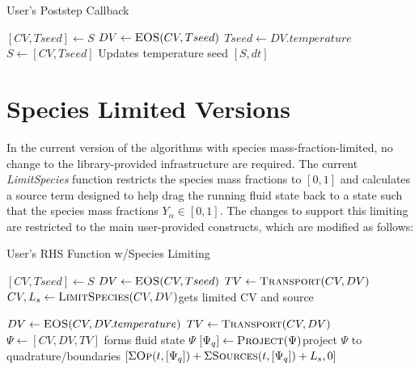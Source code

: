 \documentclass{article}
\begin{document}
\begin{algorithm}
  \caption{User's Poststep Callback}
  \begin{algorithmic}[1]
    \State $[CV, Tseed] \gets S$
    \State $DV \gets \Call{EOS}{CV, Tseed}$
    \State $Tseed \gets DV.temperature$
    \State $S \gets [CV, Tseed]$ \Comment Updates temperature seed
    \State \Return $[S, dt]$
    \EndProcedure  \end{algorithmic}
\end{algorithm}


\section{Species Limited Versions}
In the current version of the algorithms with species mass-fraction-limited, no change to the library-provided infrastructure are required.  The current \textit{LimitSpecies} function restricts the species mass fractions to $[0, 1]$ and calculates a source term designed to help drag the running fluid state back to a state such that the species mass fractions $Y_\alpha \in [0, 1]$.  The changes to support this limiting are restricted to the main user-provided constructs, which are modified as follows:


%
\begin{algorithm}
  \caption{User's RHS Function w/Species Limiting}
  \begin{algorithmic}[1]
    \State $[CV, Tseed] \gets S$
    \State $DV \gets \Call{EOS}{CV, Tseed}$
    \State $TV \gets \Call{Transport}{CV, DV}$
    \State $CV, L_s \gets \Call{LimitSpecies}{CV, DV}$\Comment gets limited CV and source
 
    \State $DV \gets \Call{EOS}{CV, DV.temperature}$
    \State $TV \gets \Call{Transport}{CV, DV}$
    \State $\Psi \gets [CV, DV, TV]$ \Comment forms fluid state $\Psi$
    \State $[\Psi_q] \gets \Call{Project}{\Psi}$\Comment project $\Psi$ to quadrature/boundaries
    \State \Return $[\Sigma\Call{Op}{t, [\Psi_q]} + \Sigma\Call{Sources}{t, [\Psi_q]} + L_s, 0]$
    \EndProcedure  \end{algorithmic}
\end{algorithm}
\end{document}

